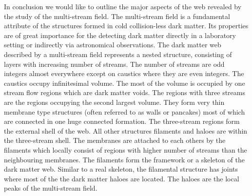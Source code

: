 



In conclusion we would like  to outline the major aspects of the web revealed by the study of the multi-stream field.
The multi-stream field is a fundamental attribute of the structures formed in cold collision-less dark matter. Its properties
are of great importance for the detecting dark matter directly in a laboratory setting or indirectly via astronomical observations.
The dark matter web described by a multi-stream field represents a nested structure, consisting of layers with increasing number of streams.
The number of streams are odd integers almost everywhere except on caustics where they are even integers.
The caustics  occupy infinitesimal volume. The most of the volume is occupied by one stream flow regions which
are dark matter voids. The regions with three streams are the regions occupying the second largest volume.
They form very thin membrane type structures (often referred to as walls or pancakes) most of which are connected 
in one huge connected formation. The three-stream regions form the external shell of the web. All other structures
filaments and haloes are within the three-stream shell.
 The membranes are attached to each others by the filaments which locally consist of regions with higher number of streams  than
the neighbouring membranes. The filaments form the framework or a skeleton of the dark matter web.  Similar to a real skeleton, the filamental structure has joints where most of the the dark matter haloes are located. The haloes are the local peaks of the multi-stream field.






%
%

%
